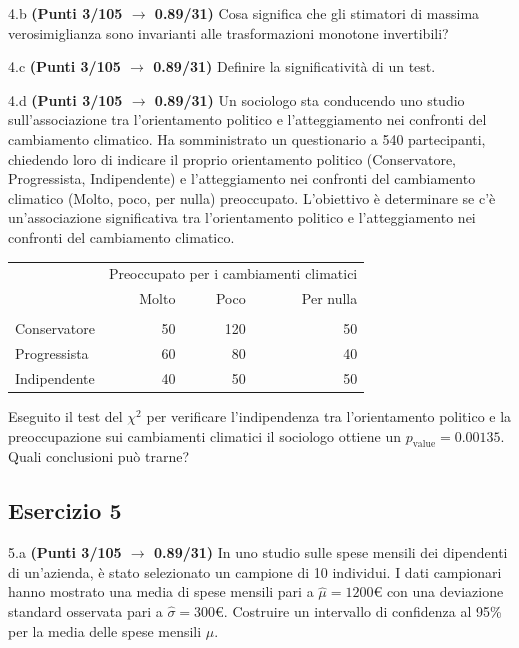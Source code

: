 \documentclass[
  11pt,
]{book}
\theoremstyle{mytheoremstyle}
\theoremstyle{mydefstyle}
\begin{document}
4.b \textbf{(Punti 3/105 \(\rightarrow\) 0.89/31)} Cosa significa che gli stimatori di massima verosimiglianza sono invarianti alle trasformazioni monotone invertibili?

4.c \textbf{(Punti 3/105 \(\rightarrow\) 0.89/31)} Definire la significatività di un test.

4.d \textbf{(Punti 3/105 \(\rightarrow\) 0.89/31)} Un sociologo sta conducendo uno studio sull'associazione tra l'orientamento politico e l'atteggiamento nei confronti del cambiamento climatico. Ha somministrato un questionario a 540 partecipanti, chiedendo loro di indicare il proprio orientamento politico (Conservatore, Progressista, Indipendente) e l'atteggiamento nei confronti del cambiamento climatico (Molto, poco, per nulla) preoccupato. L'obiettivo è determinare se c'è un'associazione significativa tra l'orientamento politico e l'atteggiamento nei confronti del cambiamento climatico.

\begin{table}[H]
\centering\centering\centering
\begin{tabular}{lrrr}
\toprule
\multicolumn{1}{c}{ } & \multicolumn{3}{c}{Preoccupato per i cambiamenti climatici} \\
\cmidrule(l{3pt}r{3pt}){2-4}
  & Molto & Poco & Per nulla\\
\midrule
\addlinespace[0.3em]
\multicolumn{4}{l}{\textbf{Orientamento politico}}\\
\hspace{1em}Conservatore & 50 & 120 & 50\\
\hspace{1em}Progressista & 60 & 80 & 40\\
\hspace{1em}Indipendente & 40 & 50 & 50\\
\bottomrule
\end{tabular}
\end{table}

Eseguito il test del \(\chi^2\) per verificare l'indipendenza tra l'orientamento politico e la preoccupazione
sui cambiamenti climatici il sociologo ottiene un \(p_\text{value}=0.00135\). Quali conclusioni può trarne?

\subsection{Esercizio 5}\label{esercizio-5-29}

5.a \textbf{(Punti 3/105 \(\rightarrow\) 0.89/31)} In uno studio sulle spese mensili dei dipendenti di un'azienda, è stato selezionato un campione di 10 individui. I dati campionari hanno mostrato una media di spese mensili pari a \(\hat\mu = 1200€\) con una deviazione standard osservata pari a \(\hat\sigma = 300€\). Costruire un intervallo di confidenza al 95\% per la media delle spese mensili \(\mu\).
\end{document}
